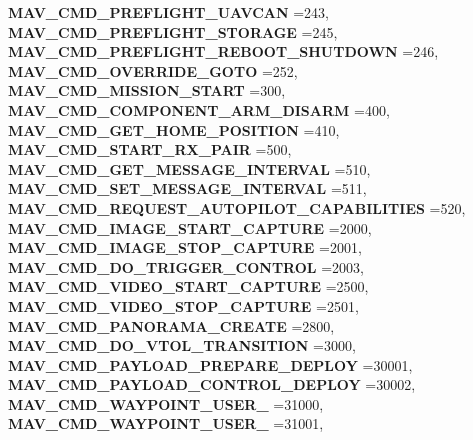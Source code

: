 \begin{DoxyCompactItemize}
\newline
\textbf{ M\+A\+V\+\_\+\+C\+M\+D\+\_\+\+P\+R\+E\+F\+L\+I\+G\+H\+T\+\_\+\+U\+A\+V\+C\+AN} =243, 
\textbf{ M\+A\+V\+\_\+\+C\+M\+D\+\_\+\+P\+R\+E\+F\+L\+I\+G\+H\+T\+\_\+\+S\+T\+O\+R\+A\+GE} =245, 
\textbf{ M\+A\+V\+\_\+\+C\+M\+D\+\_\+\+P\+R\+E\+F\+L\+I\+G\+H\+T\+\_\+\+R\+E\+B\+O\+O\+T\+\_\+\+S\+H\+U\+T\+D\+O\+WN} =246, 
\textbf{ M\+A\+V\+\_\+\+C\+M\+D\+\_\+\+O\+V\+E\+R\+R\+I\+D\+E\+\_\+\+G\+O\+TO} =252, 
\newline
\textbf{ M\+A\+V\+\_\+\+C\+M\+D\+\_\+\+M\+I\+S\+S\+I\+O\+N\+\_\+\+S\+T\+A\+RT} =300, 
\textbf{ M\+A\+V\+\_\+\+C\+M\+D\+\_\+\+C\+O\+M\+P\+O\+N\+E\+N\+T\+\_\+\+A\+R\+M\+\_\+\+D\+I\+S\+A\+RM} =400, 
\textbf{ M\+A\+V\+\_\+\+C\+M\+D\+\_\+\+G\+E\+T\+\_\+\+H\+O\+M\+E\+\_\+\+P\+O\+S\+I\+T\+I\+ON} =410, 
\textbf{ M\+A\+V\+\_\+\+C\+M\+D\+\_\+\+S\+T\+A\+R\+T\+\_\+\+R\+X\+\_\+\+P\+A\+IR} =500, 
\newline
\textbf{ M\+A\+V\+\_\+\+C\+M\+D\+\_\+\+G\+E\+T\+\_\+\+M\+E\+S\+S\+A\+G\+E\+\_\+\+I\+N\+T\+E\+R\+V\+AL} =510, 
\textbf{ M\+A\+V\+\_\+\+C\+M\+D\+\_\+\+S\+E\+T\+\_\+\+M\+E\+S\+S\+A\+G\+E\+\_\+\+I\+N\+T\+E\+R\+V\+AL} =511, 
\textbf{ M\+A\+V\+\_\+\+C\+M\+D\+\_\+\+R\+E\+Q\+U\+E\+S\+T\+\_\+\+A\+U\+T\+O\+P\+I\+L\+O\+T\+\_\+\+C\+A\+P\+A\+B\+I\+L\+I\+T\+I\+ES} =520, 
\textbf{ M\+A\+V\+\_\+\+C\+M\+D\+\_\+\+I\+M\+A\+G\+E\+\_\+\+S\+T\+A\+R\+T\+\_\+\+C\+A\+P\+T\+U\+RE} =2000, 
\newline
\textbf{ M\+A\+V\+\_\+\+C\+M\+D\+\_\+\+I\+M\+A\+G\+E\+\_\+\+S\+T\+O\+P\+\_\+\+C\+A\+P\+T\+U\+RE} =2001, 
\textbf{ M\+A\+V\+\_\+\+C\+M\+D\+\_\+\+D\+O\+\_\+\+T\+R\+I\+G\+G\+E\+R\+\_\+\+C\+O\+N\+T\+R\+OL} =2003, 
\textbf{ M\+A\+V\+\_\+\+C\+M\+D\+\_\+\+V\+I\+D\+E\+O\+\_\+\+S\+T\+A\+R\+T\+\_\+\+C\+A\+P\+T\+U\+RE} =2500, 
\textbf{ M\+A\+V\+\_\+\+C\+M\+D\+\_\+\+V\+I\+D\+E\+O\+\_\+\+S\+T\+O\+P\+\_\+\+C\+A\+P\+T\+U\+RE} =2501, 
\newline
\textbf{ M\+A\+V\+\_\+\+C\+M\+D\+\_\+\+P\+A\+N\+O\+R\+A\+M\+A\+\_\+\+C\+R\+E\+A\+TE} =2800, 
\textbf{ M\+A\+V\+\_\+\+C\+M\+D\+\_\+\+D\+O\+\_\+\+V\+T\+O\+L\+\_\+\+T\+R\+A\+N\+S\+I\+T\+I\+ON} =3000, 
\textbf{ M\+A\+V\+\_\+\+C\+M\+D\+\_\+\+P\+A\+Y\+L\+O\+A\+D\+\_\+\+P\+R\+E\+P\+A\+R\+E\+\_\+\+D\+E\+P\+L\+OY} =30001, 
\textbf{ M\+A\+V\+\_\+\+C\+M\+D\+\_\+\+P\+A\+Y\+L\+O\+A\+D\+\_\+\+C\+O\+N\+T\+R\+O\+L\+\_\+\+D\+E\+P\+L\+OY} =30002, 
\newline
\textbf{ M\+A\+V\+\_\+\+C\+M\+D\+\_\+\+W\+A\+Y\+P\+O\+I\+N\+T\+\_\+\+U\+S\+E\+R\+\_} =31000, 
\textbf{ M\+A\+V\+\_\+\+C\+M\+D\+\_\+\+W\+A\+Y\+P\+O\+I\+N\+T\+\_\+\+U\+S\+E\+R\+\_} =31001, 

\end{DoxyCompactItemize}
